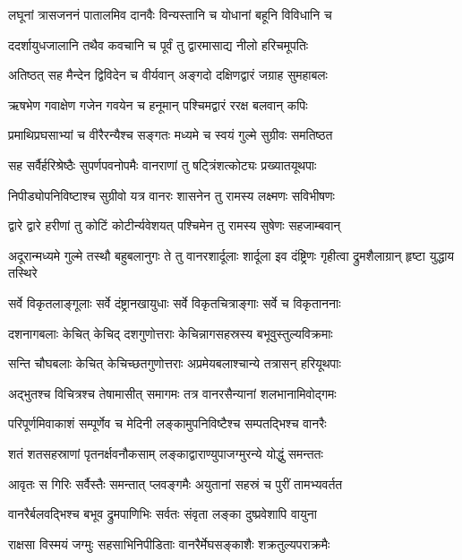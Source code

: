 \twolineshloka
{लघूनां त्रासजननं पातालमिव दानवैः}
{विन्यस्तानि च योधानां बहूनि विविधानि च} %

\twolineshloka
{ददर्शायुधजालानि तथैव कवचानि च}
{पूर्वं तु द्वारमासाद्य नीलो हरिचमूपतिः} %

\twolineshloka
{अतिष्ठत् सह मैन्देन द्विविदेन च वीर्यवान्}
{अङ्गदो दक्षिणद्वारं जग्राह सुमहाबलः} %

\twolineshloka
{ऋषभेण गवाक्षेण गजेन गवयेन च}
{हनूमान् पश्चिमद्वारं ररक्ष बलवान् कपिः} %

\twolineshloka
{प्रमाथिप्रघसाभ्यां च वीरैरन्यैश्च सङ्गतः}
{मध्यमे च स्वयं गुल्मे सुग्रीवः समतिष्ठत} %

\twolineshloka
{सह सर्वैर्हरिश्रेष्ठैः सुपर्णपवनोपमैः}
{वानराणां तु षट्त्रिंशत्कोट्यः प्रख्यातयूथपाः} %

\twolineshloka
{निपीड्योपनिविष्टाश्च सुग्रीवो यत्र वानरः}
{शासनेन तु रामस्य लक्ष्मणः सविभीषणः} %

\twolineshloka
{द्वारे द्वारे हरीणां तु कोटिं कोटीर्न्यवेशयत्}
{पश्चिमेन तु रामस्य सुषेणः सहजाम्बवान्} %

\threelineshloka
{अदूरान्मध्यमे गुल्मे तस्थौ बहुबलानुगः}
{ते तु वानरशार्दूलाः शार्दूला इव दंष्ट्रिणः}
{गृहीत्वा द्रुमशैलाग्रान् हृष्टा युद्धाय तस्थिरे} %

\twolineshloka
{सर्वे विकृतलाङ्गूलाः सर्वे दंष्ट्रानखायुधाः}
{सर्वे विकृतचित्राङ्गाः सर्वे च विकृताननाः} %

\twolineshloka
{दशनागबलाः केचित् केचिद् दशगुणोत्तराः}
{केचिन्नागसहस्रस्य बभूवुस्तुल्यविक्रमाः} %

\twolineshloka
{सन्ति चौघबलाः केचित् केचिच्छतगुणोत्तराः}
{अप्रमेयबलाश्चान्ये तत्रासन् हरियूथपाः} %

\twolineshloka
{अद्भुतश्च विचित्रश्च तेषामासीत् समागमः}
{तत्र वानरसैन्यानां शलभानामिवोद्गमः} %

\twolineshloka
{परिपूर्णमिवाकाशं सम्पूर्णेव च मेदिनी}
{लङ्कामुपनिविष्टैश्च सम्पतद्भिश्च वानरैः} %

\twolineshloka
{शतं शतसहस्राणां पृतनर्क्षवनौकसाम्}
{लङ्काद्वाराण्युपाजग्मुरन्ये योद्धुं समन्ततः} %

\twolineshloka
{आवृतः स गिरिः सर्वैस्तैः समन्तात् प्लवङ्गमैः}
{अयुतानां सहस्रं च पुरीं तामभ्यवर्तत} %

\twolineshloka
{वानरैर्बलवद्भिश्च बभूव द्रुमपाणिभिः}
{सर्वतः संवृता लङ्का दुष्प्रवेशापि वायुना} %

\twolineshloka
{राक्षसा विस्मयं जग्मुः सहसाभिनिपीडिताः}
{वानरैर्मेघसङ्काशैः शक्रतुल्यपराक्रमैः} %

